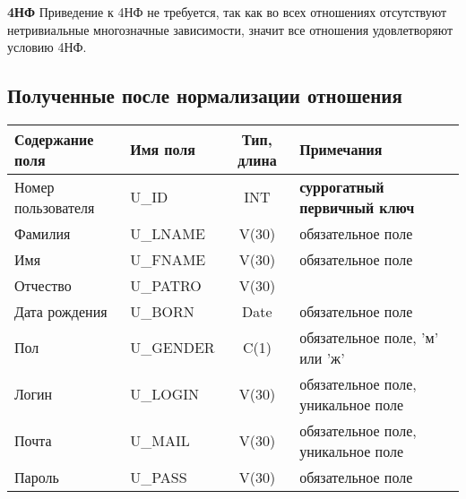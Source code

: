 \documentclass[a4paper,14pt]{article}
\begin{document}
\textbf{4НФ}
Приведение к 4НФ не требуется, так как во всех отношениях отсутствуют нетривиальные многозначные зависимости, значит все отношения удовлетворяют условию 4НФ.


\subsection{Полученные после нормализации отношения}




\begin{table}[H]
	\begin{flushleft} 
	\end{flushleft}
	\begin{adjustbox}{width=\linewidth}
		\begin{tabular}{|l|l|c|l|}
			\hline
			Содержание поля    & Имя поля  & Тип, длина & Примечания                          \\ \hline
			Номер пользователя & U\_ID     &    INT    & \textbf{суррогатный первичный ключ} \\ \hline
			Фамилия            & U\_LNAME  &   V(30)    & обязательное поле                   \\ \hline
			Имя                & U\_FNAME  &   V(30)    & обязательное поле                   \\ \hline
			Отчество           & U\_PATRO  &   V(30)    &                                     \\ \hline
			Дата рождения      & U\_BORN   &    Date    & обязательное поле                   \\ \hline
			Пол                & U\_GENDER &    C(1)    & обязательное поле, 'м' или 'ж'      \\ \hline
			Логин              & U\_LOGIN  &   V(30)    & обязательное поле, уникальное поле  \\ \hline
			Почта              & U\_MAIL   &   V(30)    & обязательное поле, уникальное поле  \\ \hline
			Пароль             & U\_PASS   &   V(30)    & обязательное поле                   \\ \hline
		\end{tabular}
	\end{adjustbox}
\end{table}

\end{document}
